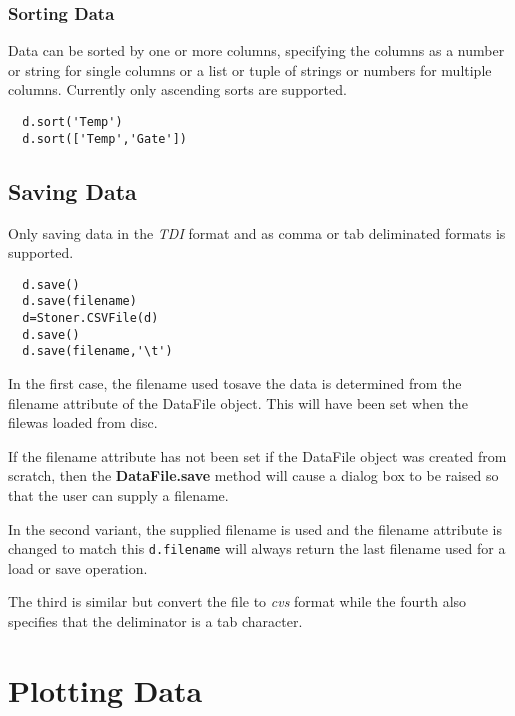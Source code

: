 \documentclass[a4paper,11pt]{scrartcl}
\begin{document}
\subsubsection{Sorting Data}

Data can be sorted by one or more columns, specifying the columns as a number or
string for single columns or a list or tuple of strings or numbers for multiple
columns. Currently only ascending sorts are supported.

\begin{lstlisting}
  d.sort('Temp')
  d.sort(['Temp','Gate'])
\end{lstlisting}

\subsection{Saving Data}\label{save}

Only saving data in the \textit{TDI} format and as comma or tab deliminated formats is supported.


\begin{lstlisting}
  d.save()
  d.save(filename)
  d=Stoner.CSVFile(d)
  d.save()
  d.save(filename,'\t')
\end{lstlisting}

In the first case, the filename used tosave the data is determined from the
filename attribute of the DataFile object. This will have been set when the
filewas loaded from disc.

If the filename attribute has not been set \eg if the DataFile object was
created from scratch, then the \textbf{DataFile.save} method will cause a dialog
box to be raised so that the user can supply a filename.

In the second variant, the supplied filename is used and the filename attribute
is changed to match this \ie \verb#d.filename# will always return the last
filename used for a load or save operation.

The third is similar but convert the file to \textit{cvs} format while the fourth also specifies that the deliminator is a tab character.

\section{Plotting Data}
\end{document}
